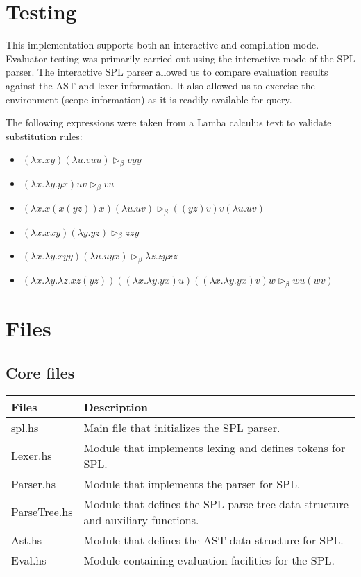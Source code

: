 \documentclass{article}
\begin{document}
\section{Testing}

This implementation supports both an interactive and compilation mode. Evaluator
testing was primarily carried out using the interactive-mode of the SPL parser.
The interactive SPL parser allowed us to compare evaluation results against the
AST and lexer information. It also allowed us to exercise the environment 
(scope information) as it is readily available for query.

The following expressions were taken from a Lamba calculus text to validate
substitution rules:\\
\begin{itemize}
\item $(\lambda x.x y)(\lambda u.v u u) \rhd _\beta vyy$ 
\item $(\lambda x.\lambda y.y x)u v \rhd _\beta vu$ 
\item $(\lambda x.x(x(y z))x)(\lambda u.u v) \rhd _\beta ((yz)v)v(\lambda u.uv)$
\item $(\lambda x.x x y)(\lambda y.y z) \rhd _\beta zzy$ 
\item $(\lambda x.\lambda y.x y y)(\lambda u.u y x) \rhd _\beta \lambda z.zyxz$
\item $(\lambda x.\lambda y.\lambda z.x z(y z))((\lambda x.\lambda y.y x)u)((\lambda x.\lambda y.y x)v)w \rhd _\beta wu(wv)$
\end{itemize}

\section{Files}
\subsection{Core files}
\begin{tabular}{|l|l|}
  \hline
{\bf Files}&{\bf Description}\\
  \hline
spl.hs & Main file that initializes the SPL parser.\\
  \hline
Lexer.hs & Module that implements lexing and defines tokens for SPL.\\
  \hline
Parser.hs & Module that implements the parser for SPL.\\
  \hline
ParseTree.hs & Module that defines the SPL parse tree data structure and 
auxiliary functions.\\
  \hline
Ast.hs & Module that defines the AST data structure for SPL.\\
  \hline
Eval.hs & Module containing evaluation facilities for the SPL.\\
  \hline
\end{tabular}
\end{document}
